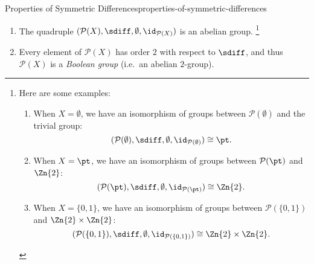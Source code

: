 \begin{proposition}{Properties of Symmetric Differences}{properties-of-symmetric-differences}
\begin{enumerate}
\begin{enumerate}
                \item\label{properties-of-symmetric-differences-interaction-with-powersets-and-groups-a}The quadruple $(\mathcal{P}(X),\sdiff,\emptyset,\id_{\mathcal{P}(X)})$ is an abelian group.%
                    \footnote{%
                        Here are some examples:
                        \begin{enumerate}
                            \item\label{proof-of-properties-of-symmetric-differences-interaction-with-powersets-and-groups-a-1}When $X=\emptyset$, we have an isomorphism of groups between $\mathcal{P}(\emptyset)$ and the trivial group:
                                \[
                                    (\mathcal{P}(\emptyset),\sdiff,\emptyset,\id_{\mathcal{P}(\emptyset)})
                                    \cong
                                    \pt.
                                \]%
                            \item\label{proof-of-properties-of-symmetric-differences-interaction-with-powersets-and-groups-a-2}When $X=\pt$, we have an isomorphism of groups between $\mathcal{P}(\pt)$ and $\Zn{2}$:
                                \[
                                    (\mathcal{P}(\pt),\sdiff,\emptyset,\id_{\mathcal{P}(\pt)})
                                    \cong
                                    \Zn{2}.
                                \]%
                            \item\label{proof-of-properties-of-symmetric-differences-interaction-with-powersets-and-groups-a-3}When $X=\{0,1\}$, we have an isomorphism of groups between $\mathcal{P}(\{0,1\})$ and $\Zn{2}\times\Zn{2}$:
                                \[
                                    (\mathcal{P}(\{0,1\}),\sdiff,\emptyset,\id_{\mathcal{P}(\{0,1\})})
                                    \cong
                                    \Zn{2}\times\Zn{2}.
                                \]%
                        \end{enumerate}
                        \par\vspace*{\TCBBoxCorrection}
                    }%
                \item\label{properties-of-symmetric-differences-interaction-with-powersets-and-groups-b}Every element of $\mathcal{P}(X)$ has order $2$ with respect to $\sdiff$, and thus $\mathcal{P}(X)$ is a \emph{Boolean group} (i.e.\ an abelian $2$-group).

\end{enumerate}
\end{enumerate}
\end{proposition}
